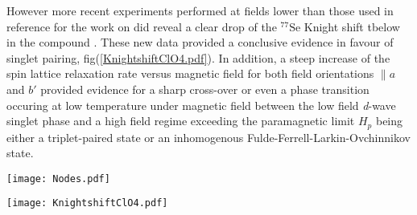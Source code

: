 \documentclass[11pt]{article} %
\begin{document}
However more recent experiments performed at fields lower than those used in reference\cite{Lee01} for the work on  did reveal a  clear drop of the  $^{77}\mathrm{Se}$ Knight shift tbelow \tc in the compound \tmc \cite{Shinagawa07}. These new data  provided a conclusive evidence in favour of singlet pairing, fig(\ref{KnightshiftClO4.pdf}). In addition, a steep increase of the spin lattice relaxation rate versus magnetic field  for both field orientations $\parallel a$ and $b'$ provided  evidence for a sharp cross-over or even a phase transition  occuring at low temperature under magnetic field  between the low field \textit{d}-wave singlet phase and a high field regime exceeding the paramagnetic limit $H_p$ being either a triplet-paired state\cite{Shimahara00,Belmechri07} or an inhomogenous Fulde-Ferrell-Larkin-Ovchinnikov state\cite{Fulde64,Larkin65}.
\begin{figure*}[htbp]	
 \centerline{\texttt{[image: Nodes.pdf]}}
\caption{Possible gap symmetries agreeing with the different  experimental results. The \textit{d}-wave  (or \textit{g}-wave) symmetry  is the only symmetry agreeing with all experiments, (yellow column on line).}
\label{Nodes.pdf} 
\end{figure*}
\begin{figure*}[htbp]	
 \centerline{\texttt{[image: KnightshiftClO4.pdf]}}
\caption{ $^{77}Se$ Knight shift vs $T$ for \tmc, for $H// b'$ and $a$, according to reference \cite{Shinagawa07}. The sign of the variation  of  Knight shift at \tc depends on the sign of the hyperfine field. A variation   is observed only under low magnetic field. The difference of \tc for the two field orientations is related to the anitropy of .  The field of $ 4T$ is still lower than the critical field derived from the onset of the resistive transition ($\approx 5T)$.  }
\label{KnightshiftClO4.pdf} 
\end{figure*}
\end{document}
